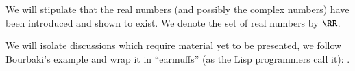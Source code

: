 \begin{remark}
We will stipulate that the real numbers (and possibly the complex
numbers) have been introduced and shown to exist. We denote the set of
real numbers by $\RR$.
\end{remark}

\begin{remark}
We will isolate discussions which require material yet to be
presented, we follow Bourbaki's example and wrap it in ``earmuffs''
(as the Lisp programmers call it): \future{$\cdots$}.
\end{remark}